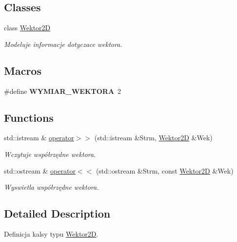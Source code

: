 \subsection*{Classes}
\begin{DoxyCompactItemize}
\item 
class \hyperlink{class_wektor2_d}{Wektor2\+D}
\begin{DoxyCompactList}\small\item\em Modeluje informacje dotyczace wektora. \end{DoxyCompactList}\end{DoxyCompactItemize}
\subsection*{Macros}
\begin{DoxyCompactItemize}
\item 
\hypertarget{_wektor2_d_8hh_a837652d626680cf1da4d0b5309b1e80a}{\#define {\bfseries W\+Y\+M\+I\+A\+R\+\_\+\+W\+E\+K\+T\+O\+R\+A}~2}\label{_wektor2_d_8hh_a837652d626680cf1da4d0b5309b1e80a}

\end{DoxyCompactItemize}
\subsection*{Functions}
\begin{DoxyCompactItemize}
\item 
std\+::istream \& \hyperlink{_wektor2_d_8hh_add22cd44a5725ef9bd7ec6954a40c23c}{operator$>$$>$} (std\+::istream \&Strm, \hyperlink{class_wektor2_d}{Wektor2\+D} \&Wek)
\begin{DoxyCompactList}\small\item\em Wczytuje współrzędne wektora. \end{DoxyCompactList}\item 
std\+::ostream \& \hyperlink{_wektor2_d_8hh_a441a89c1708691259d6afd762fdfada2}{operator$<$$<$} (std\+::ostream \&Strm, const \hyperlink{class_wektor2_d}{Wektor2\+D} \&Wek)
\begin{DoxyCompactList}\small\item\em Wyswietla współrzędne wektora. \end{DoxyCompactList}\end{DoxyCompactItemize}


\subsection{Detailed Description}
Definicja kalsy typu \hyperlink{class_wektor2_d}{Wektor2\+D}. 

